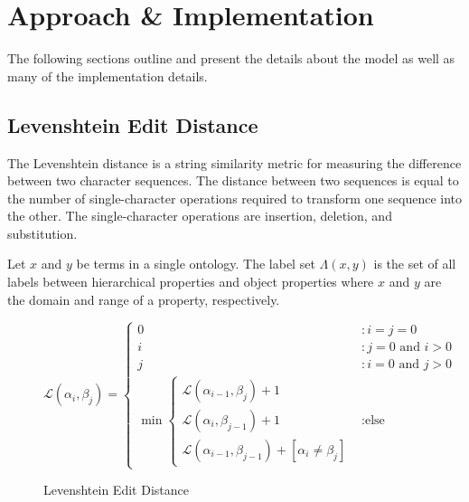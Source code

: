 \documentclass[letterpaper,twocolumn,12pt]{article}
\begin{document}

\section{Approach \& Implementation}
\label{sec:approach}

The following sections outline and present the details about the model as well as 
many of the implementation details.

\subsection{Levenshtein Edit Distance}

The Levenshtein distance is a string similarity metric for measuring the difference 
between two character sequences. 
The distance between two sequences is equal to the number of single-character 
operations required to transform one sequence into the other. 
The single-character operations are insertion, deletion, and substitution.

\begin{defn}
Let $x$ and $y$ be terms in a single ontology. The label set $\Lambda \left( x, y \right)$ is the set of all labels between hierarchical properties and object properties where $x$ and $y$ are the domain and range of a property, respectively.
\end{defn}

\begin{figure*}
\centering
\begin{equation*}
\mathcal{L} 
\left( \alpha_i, \beta_j \right) = \left\{
	\begin{array}{ll}
   	 	0 &: i=j=0 \\
		i &: j = 0 \text{ and } i > 0 \\
		j &: i = 0 \text{ and } j > 0 \\
		\min 
			\left\{ 
			\begin{array}{l}
				\mathcal{L} \left( \alpha_{i-1}, \beta_j \right) + 1 \\
          		        \mathcal{L} \left( \alpha_i, \beta_{j-1} \right) + 1 \\
          		        \mathcal{L} \left( \alpha_{i-1}, \beta_{j-1} \right) + [\alpha_i \neq \beta_j]
			\end{array} \right. &: \text{else}
     \end{array}
\right.
\end{equation*}
\caption{Levenshtein Edit Distance}
\end{figure*}
\end{document}
